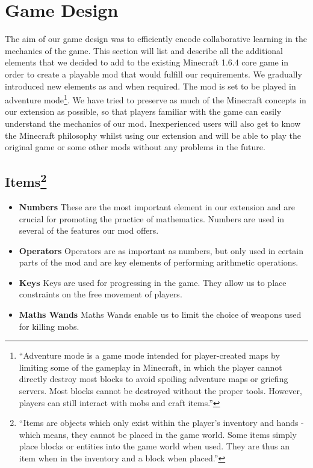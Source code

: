 \section{Game Design}
The aim of our game design was to efficiently encode collaborative learning in the mechanics of the game. This section will list and describe all the additional elements that we decided to add to the existing Minecraft 1.6.4 core game in order to create a playable mod that would fulfill our requirements. We gradually introduced new elements as and when required.
\newline\newline
The mod is set to be played in adventure mode\footnote{``Adventure mode is a game mode intended for player-created maps by limiting some of the gameplay in Minecraft, in which the player cannot directly destroy most blocks to avoid spoiling adventure maps or griefing servers. Most blocks cannot be destroyed without the proper tools. However, players can still interact with mobs and craft items.''\cite{website:minecraft-adventure}}.
We have tried to preserve as much of the Minecraft concepts in our extension as possible, so that players familiar with the game can easily understand the mechanics of our mod. Inexperienced users will also get to know the Minecraft philosophy whilst using our extension and will be able to play the original game or some other mods without any problems in the future.

\subsection[Items]{Items\footnote{``Items are objects which only exist within the player's inventory and hands - which means, they cannot be placed in the game world. Some items simply place blocks or entities into the game world when used. They are thus an item when in the inventory and a block when placed.''\cite{website:minecraft-item}}}

\begin{itemize}

\item \textbf{Numbers}
\newline
\normalsize These are the most important element in our extension and are crucial for promoting the practice of mathematics. Numbers are used in several of the features our mod offers.

\item \textbf{Operators}
\newline
\normalsize Operators are as important as numbers, but only used in certain parts of the mod and are key elements of performing arithmetic operations.

\item \textbf{Keys}
\newline
\normalsize Keys are used for progressing in the game. They allow us to place constraints on the free movement of players.

\item \textbf{Maths Wands}
\newline
\normalsize Maths Wands enable us to limit the choice of weapons used for killing mobs.

\end{itemize}


